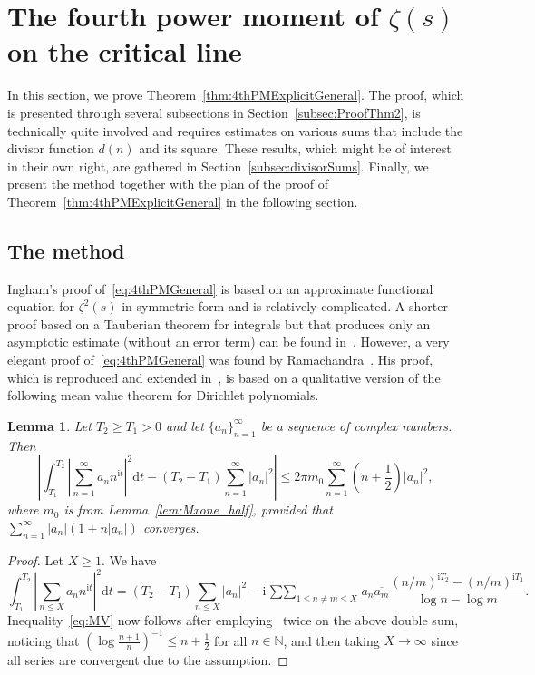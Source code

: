 \documentclass[a4paper,reqno]{amsart}
\newtheorem{lemma}[theorem]{Lemma}
\theoremstyle{definition}
\newcommand{\ie}[0]{\mathrm{i}}
\newcommand{\dif}[1]{\mathrm{d}#1}
\begin{document}
\section{The fourth power moment of \texorpdfstring{$\zeta(s)$}{zeta(s)} on the critical line}
\label{sec:4thPM}

In this section, we prove Theorem~\ref{thm:4thPMExplicitGeneral}. The proof, which is presented through several subsections in Section~\ref{subsec:ProofThm2}, is technically quite involved and requires estimates on various sums that include the divisor function $d(n)$ and its square. These results, which might be of interest in their own right, are gathered in Section~\ref{subsec:divisorSums}. Finally, we present the method together with the plan of the proof of Theorem~\ref{thm:4thPMExplicitGeneral} in the following section.

\subsection{The method}
\label{subsec:4thPMmethod}

Ingham's proof of~\eqref{eq:4thPMGeneral} is based on an approximate functional equation for $\zeta^2(s)$ in symmetric form and is relatively complicated. A shorter proof based on a Tauberian theorem for integrals but that produces only an asymptotic estimate (without an error term) can be found in~\cite[Section~7]{titchmarsh1986theory}. However, a very elegant proof of~\eqref{eq:4thPMGeneral} was found by Ramachandra~\cite{Ramachandra75}. His proof, which is reproduced and extended in~\cite[Section~5.3]{Ivic}, is based on a qualitative version of the following mean value theorem for Dirichlet polynomials.

\begin{lemma}
\label{lem:MV}
Let $T_2\geq T_1>0$ and let $\{a_n\}_{n=1}^{\infty}$ be a sequence of complex numbers. Then
\begin{equation}
\label{eq:MV}
\left|\int_{T_1}^{T_2}\left|\sum_{n=1}^{\infty}a_n n^{\ie t}\right|^{2}\dif{t} - \left(T_2-T_1\right)\sum_{n=1}^{\infty}|a_n|^2\right| \leq 2\pi m_0\sum_{n=1}^{\infty}\left(n+\frac{1}{2}\right)|a_n|^{2},
\end{equation}
where $m_0$ is from Lemma~\ref{lem:Mxone_half}, provided that $\sum_{n=1}^{\infty}|a_n|\left(1+n|a_n|\right)$ converges.
\end{lemma}

\begin{proof}
Let $X\geq 1$. We have
\[
\int_{T_1}^{T_2}\left|\sum_{n\leq X}a_n n^{\ie t}\right|^{2}\dif{t} = \left(T_2-T_1\right)\sum_{n\leq X}|a_n|^{2} - \ie\mathop{\sum\sum}_{1\leq n\neq m\leq X}a_n\overline{a_m}\frac{(n/m)^{\ie T_2}-(n/m)^{\ie T_1}}{\log{n}-\log{m}}.
\]
Inequality~\eqref{eq:MV} now follows after employing~\cite[Inequality (D)]{Preissmann} twice on the above double sum, noticing that $\left(\log{\frac{n+1}{n}}\right)^{-1}\leq n+\frac{1}{2}$ for all $n\in\mathbb{N}$, and then taking $X\to\infty$ since all series are convergent due to the assumption. 
\end{proof}
\end{document}
